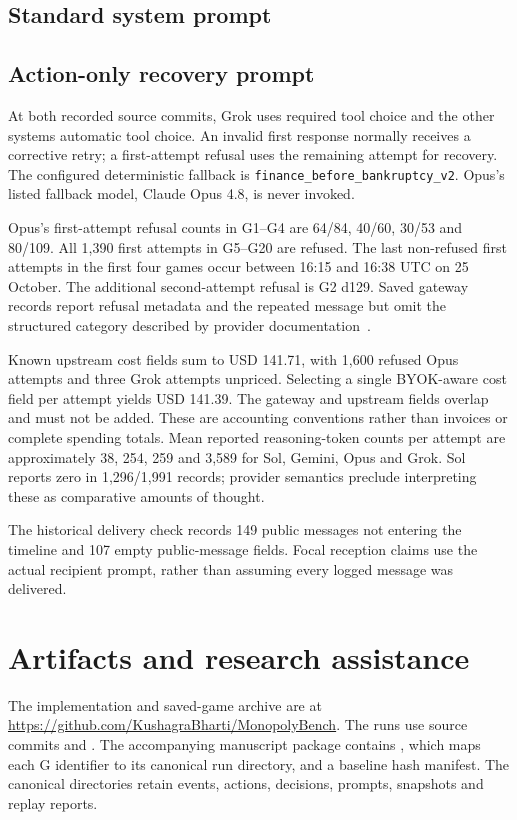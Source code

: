 \subsection*{Standard system prompt}

\subsection*{Action-only recovery prompt}


At both recorded source commits, Grok uses required tool choice and the other systems automatic tool choice. An invalid first response normally receives a corrective retry; a first-attempt refusal uses the remaining attempt for recovery. The configured deterministic fallback is \texttt{finance\_before\_bankruptcy\_v2}. Opus's listed fallback model, Claude Opus 4.8, is never invoked.

Opus's first-attempt refusal counts in G1--G4 are 64/84, 40/60, 30/53 and 80/109. All 1,390 first attempts in G5--G20 are refused. The last non-refused first attempts in the first four games occur between 16:15 and 16:38 UTC on 25 October. The additional second-attempt refusal is G2 d129. Saved gateway records report refusal metadata and the repeated message but omit the structured category described by provider documentation~\cite{anthropic2026reasoning}.

Known upstream cost fields sum to USD 141.71, with 1,600 refused Opus attempts and three Grok attempts unpriced. Selecting a single BYOK-aware cost field per attempt yields USD 141.39. The gateway and upstream fields overlap and must not be added. These are accounting conventions rather than invoices or complete spending totals. Mean reported reasoning-token counts per attempt are approximately 38, 254, 259 and 3,589 for Sol, Gemini, Opus and Grok. Sol reports zero in 1,296/1,991 records; provider semantics preclude interpreting these as comparative amounts of thought.

The historical delivery check records 149 public messages not entering the timeline and 107 empty public-message fields. Focal reception claims use the actual recipient prompt, rather than assuming every logged message was delivered.

\section{Artifacts and research assistance}
\label{app:artifacts}\label{app:provenance}
The implementation and saved-game archive are at \url{https://github.com/KushagraBharti/MonopolyBench}. The runs use source commits  and . The accompanying manuscript package contains , which maps each G identifier to its canonical run directory, and a baseline hash manifest. The canonical directories retain events, actions, decisions, prompts, snapshots and replay reports.

